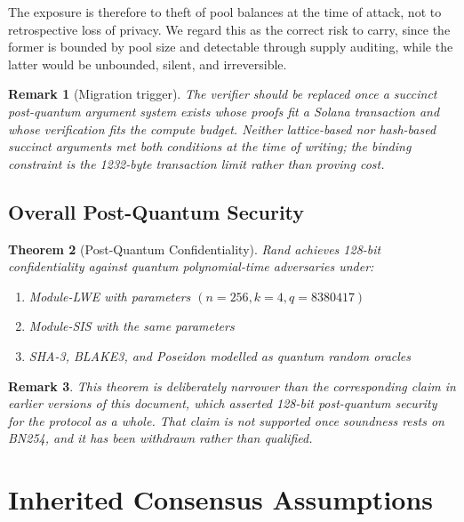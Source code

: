 \documentclass[11pt,a4paper]{article}
\newtheorem{theorem}{Theorem}[section]
\newtheorem{remark}[theorem]{Remark}
\begin{document}
The exposure is therefore to theft of pool balances at the time of attack, not to retrospective loss of privacy. We regard this as the correct risk to carry, since the former is bounded by pool size and detectable through supply auditing, while the latter would be unbounded, silent, and irreversible.

\begin{remark}[Migration trigger]
The verifier should be replaced once a succinct post-quantum argument system exists whose proofs fit a Solana transaction and whose verification fits the compute budget. Neither lattice-based nor hash-based succinct arguments met both conditions at the time of writing; the binding constraint is the 1232-byte transaction limit rather than proving cost.
\end{remark}

\subsection{Overall Post-Quantum Security}

\begin{theorem}[Post-Quantum Confidentiality]
Rand achieves 128-bit \emph{confidentiality} against quantum polynomial-time adversaries under:
\begin{enumerate}
    \item Module-LWE with parameters $(n = 256, k = 4, q = 8380417)$
    \item Module-SIS with the same parameters
    \item SHA-3, BLAKE3, and Poseidon modelled as quantum random oracles
\end{enumerate}
\end{theorem}

\begin{remark}
This theorem is deliberately narrower than the corresponding claim in earlier versions of this document, which asserted 128-bit post-quantum security for the protocol as a whole. That claim is not supported once soundness rests on BN254, and it has been withdrawn rather than qualified.
\end{remark}

\section{Inherited Consensus Assumptions}
\end{document}
